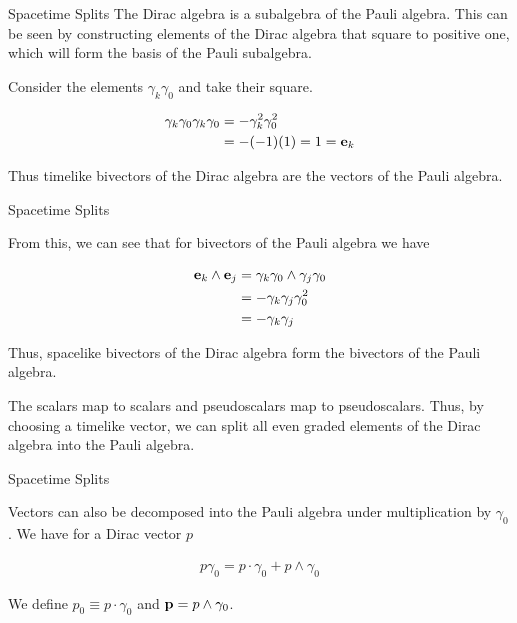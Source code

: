 \documentclass{beamer}
\begin{document}
\begin{frame}{Spacetime Splits}
The Dirac algebra is a subalgebra of the Pauli algebra. This can be seen by constructing elements of the Dirac algebra that square to positive one, which will form the basis of the Pauli subalgebra.
\pause

Consider the elements $\gamma_k\gamma_0$ and take their square.

\begin{align*}
	\gamma_k\gamma_0\gamma_k\gamma_0 &= -\gamma_k^2 \gamma_0^2 \\
	&= - (-1) (1) = 1 = \vb e_k
\end{align*}

\pause

Thus timelike bivectors of the Dirac algebra are the vectors of the Pauli algebra.
\end{frame}

\begin{frame}{Spacetime Splits}

From this, we can see that for bivectors of the Pauli algebra we have

\begin{align*}
	\vb e_k \wedge \vb e_j &= \gamma_k\gamma_0 \wedge \gamma_j\gamma_0 \\
	&= -\gamma_k\gamma_j \gamma_0^2 \\
	&= -\gamma_k\gamma_j
\end{align*}

\pause

Thus, spacelike bivectors of the Dirac algebra form the bivectors of the Pauli algebra.

\pause

The scalars map to scalars and pseudoscalars map to pseudoscalars. Thus, by choosing a timelike vector, we can split all even graded elements of the Dirac algebra into the Pauli algebra.

\end{frame}

\begin{frame}{Spacetime Splits}

Vectors can also be decomposed into the Pauli algebra under multiplication by $\gamma_0$. We have for a Dirac vector $p$

\begin{align*}
	p\gamma_0 = p\cdot \gamma_0 + p\wedge \gamma_0
\end{align*}

We define $p_0 \equiv p \cdot \gamma_0$ and $\vb p = p \wedge \gamma_0$.

\end{frame}
\end{document}
